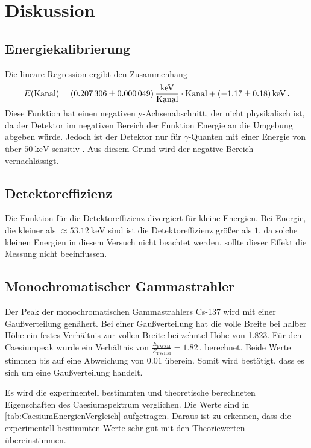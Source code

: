 \section{Diskussion}
\label{sec:Diskussion}


\subsection{Energiekalibrierung}

Die lineare Regression ergibt den Zusammenhang 
\begin{equation*}
    E(\text{Kanal}) = \SI{0.207306 \pm 0.000049}{\frac{\kilo\eV}{\text{Kanal}}} \cdot \text{Kanal} + \SI{-1.17 \pm 0.18}{\kilo\eV}\,.
\end{equation*}
Diese Funktion hat einen negativen y-Achsenabschnitt, der nicht physikalisch ist, da der Detektor im negativen Bereich der Funktion Energie an die Umgebung abgeben würde.
Jedoch ist der Detektor nur für $\gamma$-Quanten mit einer Energie von über $\SI{50}{\kilo\eV}$ sensitiv \cite{v18}.
Aus diesem Grund wird der negative Bereich vernachlässigt.


\subsection{Detektoreffizienz}

Die Funktion für die Detektoreffizienz divergiert für kleine Energien.
Bei Energie, die kleiner als $\approx \SI{53.12}{\kilo\eV}$ sind ist die Detektoreffizienz größer als $1$, 
da solche kleinen Energien in diesem Versuch nicht beachtet werden, sollte dieser Effekt die Messung nicht beeinflussen.


\subsection{Monochromatischer Gammastrahler}

Der Peak der monochromatischen Gammastrahlers Cs-137 wird mit einer Gaußverteilung genähert.
Bei einer Gaußverteilung hat die volle Breite bei halber Höhe ein festes Verhältnis zur vollen Breite bei zehntel Höhe von 1.823.
Für den Caesiumpeak wurde ein Verhältnis von $\frac{E_{\text{FWZM}}}{E_{\text{FWHM}}} = 1.82\,.$ berechnet.
Beide Werte stimmen bis auf eine Abweichung von $0.01$ überein. Somit wird bestätigt, dass es sich um eine Gaußverteilung handelt.


Es wird die experimentell bestimmten und theoretische berechneten Eigenschaften des Caesiumspektrum verglichen.
Die Werte sind in \autoref{tab:CaesiumEnergienVergleich} aufgetragen. Daraus ist zu erkennen, dass die experimentell bestimmten Werte sehr gut mit den Theoriewerten übereinstimmen.


